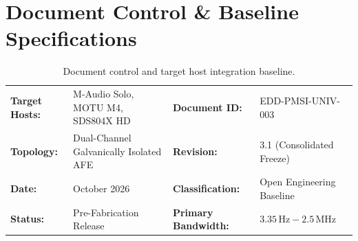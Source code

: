 \documentclass[11pt, letterpaper]{article}
\begin{document}
\section*{Document Control \& Baseline Specifications}

\begin{table}[H]
    \centering
    \small
    \setlength{\tabcolsep}{4pt}
    \begin{tabularx}{\linewidth}{@{} >{\bfseries}l L >{\bfseries}l L @{}}
        \toprule
        Target Hosts: & M-Audio Solo, MOTU M4, SDS804X HD & Document ID: & EDD-PMSI-UNIV-003 \\
        Topology: & Dual-Channel Galvanically Isolated AFE & Revision: & 3.1 (Consolidated Freeze) \\
        Date: & October 2026 & Classification: & Open Engineering Baseline \\
        Status: & Pre-Fabrication Release & Primary Bandwidth: & $3.35\,\text{Hz} - 2.5\,\text{MHz}$ \\
        \bottomrule
    \end{tabularx}
    \caption{Document control and target host integration baseline.}
    \label{tab:doc_control}
\end{table}

\vspace{0.2cm}
\end{document}

